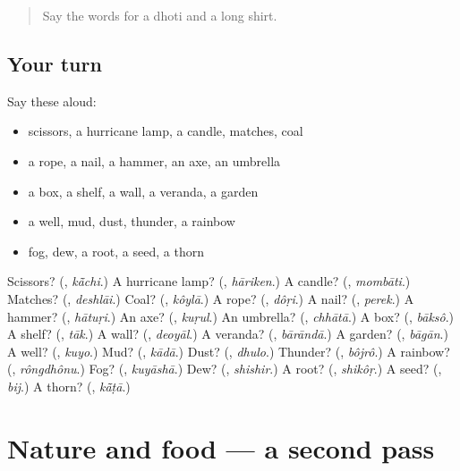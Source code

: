 \label{lesson:BN-R119-first-pass-things-in-the-house}



\begin{quote}
Say the words for a dhoti and a long shirt.
\end{quote}

\subsection*{Your turn}
Say these aloud:

\begin{itemize}
\raggedright
  \item scissors, a hurricane lamp, a candle, matches, coal
  \item a rope, a nail, a hammer, an axe, an umbrella
  \item a box, a shelf, a wall, a veranda, a garden
  \item a well, mud, dust, thunder, a rainbow
  \item fog, dew, a root, a seed, a thorn
\end{itemize}

\begin{tcolorbox}[breakable,colback=teal!4,colframe=teal!35!black,title={Before you move on}]
Scissors? (\textbf{}, \emph{kā̃chi}.) A hurricane lamp? (\textbf{}, \emph{hāriken}.) A candle? (\textbf{}, \emph{mombāti}.) Matches? (\textbf{}, \emph{deshlāi}.) Coal? (\textbf{}, \emph{kôylā}.) A rope? (\textbf{}, \emph{dôṛi}.) A nail? (\textbf{}, \emph{perek}.) A hammer? (\textbf{}, \emph{hātuṛi}.) An axe? (\textbf{}, \emph{kuṛul}.) An umbrella? (\textbf{}, \emph{chhātā}.) A box? (\textbf{}, \emph{bāksô}.) A shelf? (\textbf{}, \emph{tāk}.) A wall? (\textbf{}, \emph{deoyāl}.) A veranda? (\textbf{}, \emph{bārāndā}.) A garden? (\textbf{}, \emph{bāgān}.) A well? (\textbf{}, \emph{kuyo}.) Mud? (\textbf{}, \emph{kādā}.) Dust? (\textbf{}, \emph{dhulo}.) Thunder? (\textbf{}, \emph{bôjrô}.) A rainbow? (\textbf{}, \emph{rôngdhônu}.) Fog? (\textbf{}, \emph{kuyāshā}.) Dew? (\textbf{}, \emph{shishir}.) A root? (\textbf{}, \emph{shikôṛ}.) A seed? (\textbf{}, \emph{bij}.) A thorn? (\textbf{}, \emph{kā̃ṭā}.)
\end{tcolorbox}
\section[(dialogue)]{Nature and food — a second pass}

